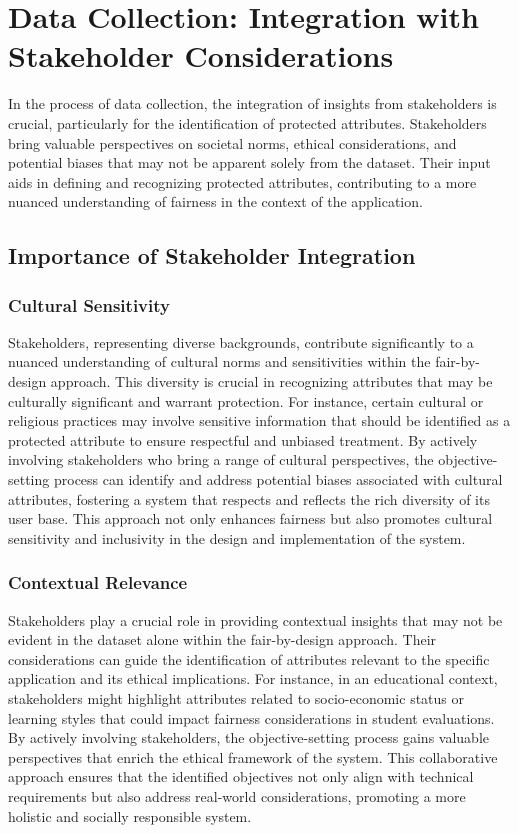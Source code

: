 \section{Data Collection: Integration with Stakeholder Considerations}
\label{section:data-collection}

In the process of data collection, the integration of insights from stakeholders is crucial, particularly for the identification of protected attributes. Stakeholders bring valuable perspectives on societal norms, ethical considerations, and potential biases that may not be apparent solely from the dataset. Their input aids in defining and recognizing protected attributes, contributing to a more nuanced understanding of fairness in the context of the application.

\subsection{Importance of Stakeholder Integration}

\subsubsection{Cultural Sensitivity}


Stakeholders, representing diverse backgrounds, contribute significantly to a nuanced understanding of cultural norms and sensitivities within the fair-by-design approach. This diversity is crucial in recognizing attributes that may be culturally significant and warrant protection. For instance, certain cultural or religious practices may involve sensitive information that should be identified as a protected attribute to ensure respectful and unbiased treatment. By actively involving stakeholders who bring a range of cultural perspectives, the objective-setting process can identify and address potential biases associated with cultural attributes, fostering a system that respects and reflects the rich diversity of its user base. This approach not only enhances fairness but also promotes cultural sensitivity and inclusivity in the design and implementation of the system.

\subsubsection{Contextual Relevance}


Stakeholders play a crucial role in providing contextual insights that may not be evident in the dataset alone within the fair-by-design approach. Their considerations can guide the identification of attributes relevant to the specific application and its ethical implications. For instance, in an educational context, stakeholders might highlight attributes related to socio-economic status or learning styles that could impact fairness considerations in student evaluations. By actively involving stakeholders, the objective-setting process gains valuable perspectives that enrich the ethical framework of the system. This collaborative approach ensures that the identified objectives not only align with technical requirements but also address real-world considerations, promoting a more holistic and socially responsible system.

